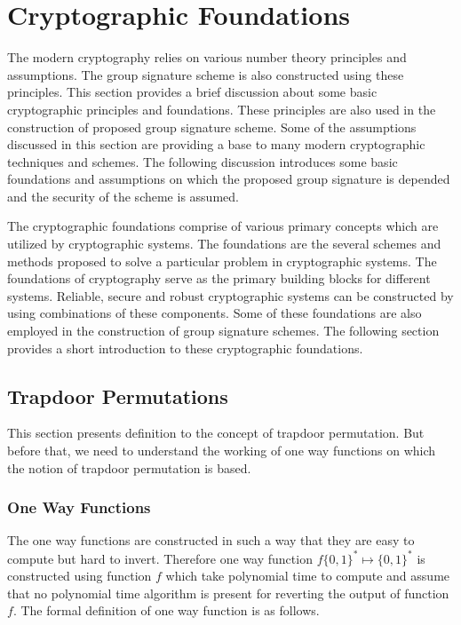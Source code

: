 \section{Cryptographic Foundations}
The modern cryptography relies on various number theory principles and assumptions. The group signature scheme is also constructed using these principles. This section provides a brief discussion about some basic cryptographic principles and foundations. These principles are also used in the construction of proposed group signature scheme. Some of the assumptions discussed in this section are providing a base to many modern cryptographic techniques and schemes. The following discussion introduces some basic foundations and assumptions on which the proposed group signature is depended and the security of the scheme is assumed.

The cryptographic foundations comprise of various primary concepts which are utilized by cryptographic systems. The foundations are the several schemes and methods proposed to solve a particular problem in cryptographic systems. The foundations of cryptography serve as the primary building blocks for different systems. Reliable, secure and robust cryptographic systems can be constructed by using combinations of these components. Some of these foundations are also employed in the construction of group signature schemes. The following section provides a short introduction to these cryptographic foundations.

\subsection{Trapdoor Permutations}\label{sub:Trapdoor Permutations}
This section presents definition to the concept of trapdoor permutation. But before that, we need to understand the working of one way functions on which the notion of trapdoor permutation is based.
\subsubsection{One Way Functions}
The one way functions are constructed in such a way that they are easy to compute but hard to invert. Therefore one way function $f\{0, 1\}^* \mapsto  \{0, 1\}^*$ is constructed using function $f$  which take polynomial time to compute and assume that no polynomial time algorithm is present for reverting the output of function $f$. The formal definition of one way function is as follows.

